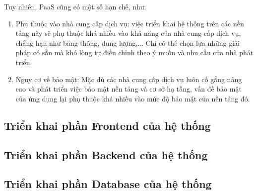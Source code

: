 Tuy nhiên, PaaS cũng có một số hạn chế, như:
\begin{enumerate}
    \item Phụ thuộc vào nhà cung cấp dịch vụ: việc triển khai hệ thống trên các nền tảng này sẽ phụ thuộc khá nhiều vào khả năng của nhà cung cấp dịch vụ, chẳng hạn như băng thông, dung lượng,... Chỉ có thể chọn lựa những giải pháp có sẵn mà khó lòng tự điều chỉnh theo ý muốn và nhu cầu của nhà phát triển.
    \item Nguy cơ về bảo mật: Mặc dù các nhà cung cấp dịch vụ luôn cố gắng nâng cao và phát triển việc bảo mật nền tảng và cơ sở hạ tầng, vấn đề bảo mật của ứng dụng lại phụ thuộc khá nhiều vào mức độ bảo mật của nền tảng đó.
\end{enumerate}

\subsection{Triển khai phần Frontend của hệ thống}

\subsection{Triển khai phần Backend của hệ thống}

\subsection{Triển khai phần Database của hệ thống}

